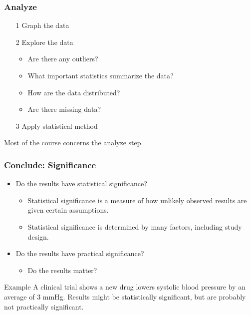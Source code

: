 \documentclass[xcolor=table]{beamer}
\begin{document}
\begin{frame}
\frametitle{Analyze}
 
\begin{block}{}
\begin{itemize}
\item [1] Graph the data
\item [2] Explore the data
\begin{itemize}
\item Are there any outliers?
\item What important statistics summarize the data?
\item How are the data distributed?
\item Are there missing data?
\end{itemize}
\item [3] Apply statistical method
\end{itemize}
\end{block}

\begin{block}{}
Most of the course concerns the analyze step.
\end{block}
\end{frame}

\begin{frame}
\frametitle{Conclude: Significance}

\begin{block}{}
\begin{itemize}
\item Do the results have statistical significance?
\begin{itemize}
\item Statistical significance is a measure of how unlikely observed results are given certain assumptions.
\item Statistical significance is determined by many factors, including study design.
\end{itemize}
\item Do the results have practical significance?
\begin{itemize}
\item Do the results matter?
\end{itemize}
\end{itemize}
\end{block}

\pause
\begin{exampleblock}{Example}
A clinical trial shows a new drug lowers systolic blood pressure by an average of 3 mmHg. Results might be statistically significant, but are probably not practically significant.
\end{exampleblock}
\end{frame}
\end{document}
